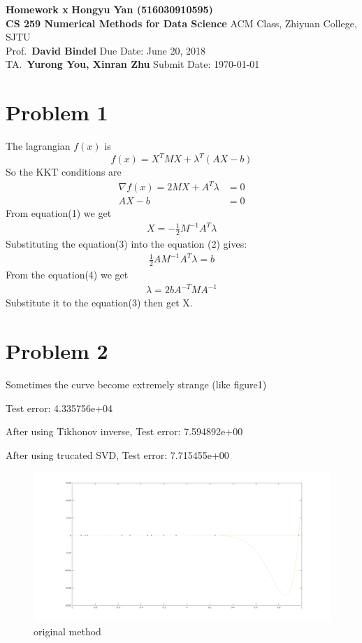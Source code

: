 \documentclass[a4paper, 11pt]{article}
\begin{document}
\noindent
\large\textbf{Homework x} \hfill \textbf{Hongyu Yan (516030910595)} \\
\normalsize {\bf CS 259 Numerical Methods for Data Science} \hfill ACM Class, Zhiyuan College, SJTU\\
Prof.~{\bf David Bindel} \hfill Due Date: June 20, 2018\\
TA.~{\bf Yurong You, Xinran Zhu} \hfill Submit Date: \today

\section*{Problem 1}

The lagrangian $f(x)$ is 
$$f(x)=X^TMX + \lambda^T(AX-b)$$
So the KKT conditions are
\begin{align}
\nabla f(x) = 2MX + A^T\lambda &= 0 \\
AX-b &=0
\end{align}
From equation(1) we get 
\begin{align}
X = -\frac{1}{2}M^{-1}A^T\lambda
\end{align}
Substituting the equation(3) into the equation (2) gives:
\begin{align}
\frac{1}{2}AM^{-1}A^T\lambda=b
\end{align}
From the equation(4) we get
\begin{align}
\lambda = 2bA^{-T}MA^{-1}
\end{align}
Substitute it to the equation(3) then get X.

\section*{Problem 2}
Sometimes the curve become extremely strange (like figure1)

Test error: 4.335756e+04

After using Tikhonov inverse, Test error: 7.594892e+00

After using trucated SVD, Test error: 7.715455e+00

\begin{figure}[htbp]
\centering
\includegraphics[scale=0.3]{figure/fig1.png}
\caption{original method}
\label{fig1}
\end{figure}
\end{document}
